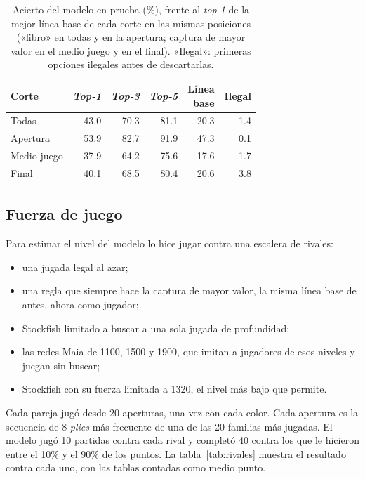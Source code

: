 \documentclass[a4paper,12pt,twocolumn]{article}
\begin{document}
\begin{table}[H]
	\centering
	\footnotesize
	\setlength{\tabcolsep}{3pt}
	\begin{tabular}{lrrrrr}
		\hline
		Corte & \textit{Top-1} & \textit{Top-3} & \textit{Top-5} & \shortstack[r]{Línea\\base} & Ilegal \\
		\hline
		Todas & 43.0 & 70.3 & 81.1 & 20.3 & 1.4 \\
		Apertura & 53.9 & 82.7 & 91.9 & 47.3 & 0.1 \\
		Medio juego & 37.9 & 64.2 & 75.6 & 17.6 & 1.7 \\
		Final & 40.1 & 68.5 & 80.4 & 20.6 & 3.8 \\
		\hline
	\end{tabular}
	\caption{Acierto del modelo en prueba (\%), frente al \textit{top-1} de la mejor línea base de cada corte en las mismas posiciones («libro» en todas y en la apertura; captura de mayor valor en el medio juego y en el final). «Ilegal»: primeras opciones ilegales antes de descartarlas.}
	\label{tab:resultados-modelo}
\end{table}

\subsection{Fuerza de juego}
\label{sec:fuerza}

Para estimar el nivel del modelo lo hice jugar contra una escalera de rivales:
\begin{itemize}[leftmargin=*]
	\item una jugada legal al azar;
	\item una regla que siempre hace la captura de mayor valor, la misma línea base de antes, ahora como jugador;
	\item Stockfish limitado a buscar a una sola jugada de profundidad;
	\item las redes Maia de 1100, 1500 y 1900, que imitan a jugadores de esos niveles y juegan sin buscar;
	\item Stockfish con su fuerza limitada a 1320, el nivel más bajo que permite.
\end{itemize}
Cada pareja jugó desde 20 aperturas, una vez con cada color. Cada apertura es la secuencia de 8 \textit{plies} más frecuente de una de las 20 familias más jugadas. El modelo jugó 10 partidas contra cada rival y completó 40 contra los que le hicieron entre el 10\% y el 90\% de los puntos. La tabla~\ref{tab:rivales} muestra el resultado contra cada uno, con las tablas contadas como medio punto.
\end{document}

